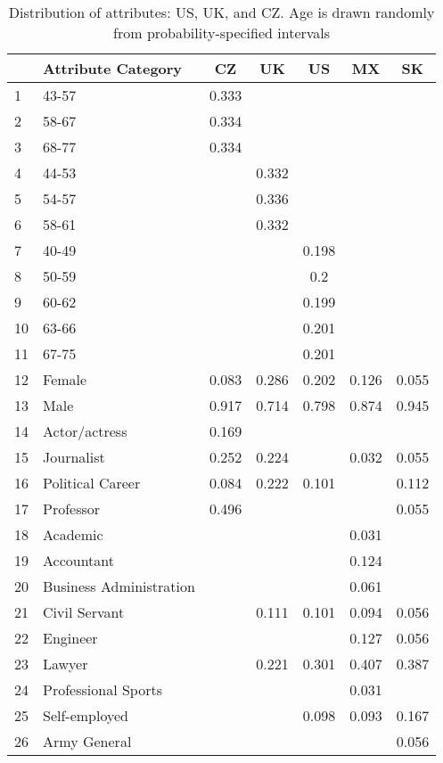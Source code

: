 \begin{longtable}{lp{7cm}ccccc}
\caption{Distribution of attributes: US, UK, and CZ. Age is drawn randomly from probability-specified intervals} \\ 
  \toprule
 & Attribute Category & CZ & UK & US & MX & SK \\ 
  \midrule
1 & 43-57 & 0.333 &  &  &  &  \\ 
  2 & 58-67 & 0.334 &  &  &  &  \\ 
  3 & 68-77 & 0.334 &  &  &  &  \\ 
  4 & 44-53 &  & 0.332 &  &  &  \\ 
  5 & 54-57 &  & 0.336 &  &  &  \\ 
  6 & 58-61 &  & 0.332 &  &  &  \\ 
  7 & 40-49 &  &  & 0.198 &  &  \\ 
  8 & 50-59 &  &  & 0.2 &  &  \\ 
  9 & 60-62 &  &  & 0.199 &  &  \\ 
  10 & 63-66 &  &  & 0.201 &  &  \\ 
  11 & 67-75 &  &  & 0.201 &  &  \\ 
  12 & Female & 0.083 & 0.286 & 0.202 & 0.126 & 0.055 \\ 
  13 & Male & 0.917 & 0.714 & 0.798 & 0.874 & 0.945 \\ 
  14 & Actor/actress & 0.169 &  &  &  &  \\ 
  15 & Journalist & 0.252 & 0.224 &  & 0.032 & 0.055 \\ 
  16 & Political Career & 0.084 & 0.222 & 0.101 &  & 0.112 \\ 
  17 & Professor & 0.496 &  &  &  & 0.055 \\ 
  18 & Academic &  &  &  & 0.031 &  \\ 
  19 & Accountant &  &  &  & 0.124 &  \\ 
  20 & Business Administration &  &  &  & 0.061 &  \\ 
  21 & Civil Servant &  & 0.111 & 0.101 & 0.094 & 0.056 \\ 
  22 & Engineer &  &  &  & 0.127 & 0.056 \\ 
  23 & Lawyer &  & 0.221 & 0.301 & 0.407 & 0.387 \\ 
  24 & Professional Sports &  &  &  & 0.031 &  \\ 
  25 & Self-employed &  &  & 0.098 & 0.093 & 0.167 \\ 
  26 & Army General &  &  &  &  & 0.056 \\ 

\end{longtable}
